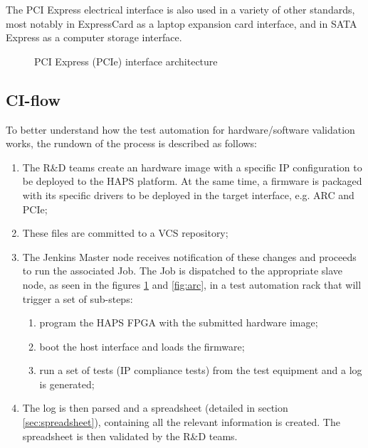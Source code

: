 The PCI Express electrical interface is also used in a variety of other standards, most notably in ExpressCard as a laptop expansion card interface, and in SATA Express as a computer storage interface.


 \begin{figure}[H]
  \centering
      \caption{PCI Express (PCIe) interface architecture}
      \label{fig:pcie}
 \end{figure}

\subsection{CI-flow}\label{sc:workflow}

To better understand how the test automation for hardware/software validation works, the rundown of the process is described as follows:

\renewcommand{\labelenumii}{\theenumii}
\renewcommand{\theenumii}{\theenumi.\arabic{enumii}.}

\begin{enumerate}

\item The R\&D teams create an hardware image with a specific IP configuration to be deployed to the HAPS platform. At the same time, a firmware is packaged with its specific drivers to be deployed in the target interface, e.g. ARC and PCIe;

\item These files are committed to a VCS repository;

\item The Jenkins Master node receives notification of these changes and proceeds to run the associated Job. The Job is dispatched to the appropriate slave node, as seen in the figures \ref{fig:pcie} and \ref{fig:arc}, in a test automation rack that will trigger a set of sub-steps:

\begin{enumerate}
\item program the HAPS FPGA with the submitted hardware image;
\item boot the host interface and loads the firmware;
\item run a set of tests (IP compliance tests) from the test equipment and a log is generated;
\end{enumerate}

\item\label{failStep} The log is then parsed and a spreadsheet (detailed in section \ref{sec:spreadsheet}), containing all the relevant information is created. The spreadsheet is then validated by the R\&D teams.

\end{enumerate}


